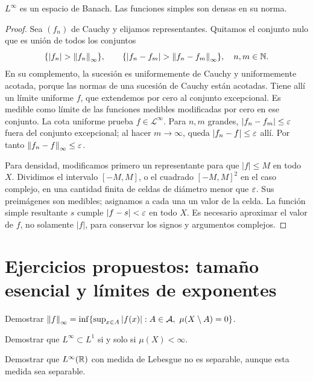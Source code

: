 \begin{teorema}\label{v2:linfty-banach}
$L^\infty$ es un espacio de Banach. Las funciones simples son densas en su norma.
\end{teorema}
\begin{proof}
Sea $(f_n)$ de Cauchy y elijamos representantes. Quitamos el conjunto nulo que es unión de todos los conjuntos
\[
 \{|f_n|>\norm{f_n}_\infty\},\qquad
 \{|f_n-f_m|>\norm{f_n-f_m}_\infty\},\quad n,m\in\N.
\]
En su complemento, la sucesión es uniformemente de Cauchy y uniformemente acotada, porque las normas de una sucesión de Cauchy están acotadas. Tiene allí un límite uniforme $f$, que extendemos por cero al conjunto excepcional. Es medible como límite de las funciones medibles modificadas por cero en ese conjunto. La cota uniforme prueba $f\in\mathcal L^\infty$. Para $n,m$ grandes, $|f_n-f_m|\le\varepsilon$ fuera del conjunto excepcional; al hacer $m\to\infty$, queda $|f_n-f|\le\varepsilon$ allí. Por tanto $\left\lVert f_n-f\right\rVert_\infty\le\varepsilon$.

Para densidad, modificamos primero un representante para que $|f|\le M$ en todo $X$. Dividimos el intervalo $[-M,M]$, o el cuadrado $[-M,M]^2$ en el caso complejo, en una cantidad finita de celdas de diámetro menor que $\varepsilon$. Sus preimágenes son medibles; asignamos a cada una un valor de la celda. La función simple resultante $s$ cumple $|f-s|<\varepsilon$ en todo $X$. Es necesario aproximar el valor de $f$, no solamente $|f|$, para conservar los signos y argumentos complejos.
\end{proof}

\section{Ejercicios propuestos: tamaño esencial y límites de exponentes}
\begin{ejercicio}\label{ej:v2-l22-1}
Demostrar $\left\lVert f\right\rVert_\infty=\inf\{\sup_{x\in A}|f(x)|:A\in\mathcal A,\ \mu(X\setminus A)=0\}$.
\end{ejercicio}

\begin{ejercicio}\label{ej:v2-l22-2}
Demostrar que $L^\infty\subset L^1$ si y solo si $\mu(X)<\infty$.
\end{ejercicio}

\begin{ejercicio}\label{ej:v2-l22-3}
Demostrar que $L^\infty(\mathbb R)$ con medida de Lebesgue no es separable, aunque esta medida sea separable.
\end{ejercicio}

